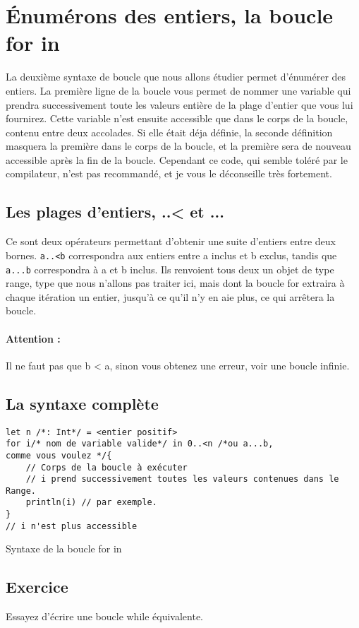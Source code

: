 \section{Énumérons des entiers, la boucle for in}
La deuxième syntaxe de boucle que nous allons étudier permet d'énumérer des entiers.
La première ligne de la boucle vous permet de nommer une variable qui prendra successivement toute les valeurs entière de la plage d'entier que vous lui fournirez.
Cette variable n'est ensuite accessible que dans le corps de la boucle,
contenu entre deux accolades.
Si elle était déja définie,
la seconde définition masquera la première dans le corps de la boucle,
et la première sera de nouveau accessible après la fin de la boucle.
Cependant ce code, qui semble toléré par le compilateur,
n'est pas recommandé, et je vous le déconseille très fortement.
\subsection{Les plages d'entiers, ..< et ...}
Ce sont deux opérateurs permettant d'obtenir une suite d'entiers entre deux bornes. \verb"a..<b" correspondra aux entiers entre a inclus et b exclus, tandis que \verb"a...b" correspondra à a et b inclus. Ils renvoient tous deux un objet de type range, type que nous n'allons pas traiter ici, mais dont la boucle for extraira à chaque itération un entier, jusqu'à ce qu'il n'y en aie plus, ce qui arrêtera la boucle.
\paragraph{Attention :}
Il ne faut pas que b < a, sinon vous obtenez une erreur, voir une boucle infinie. 
\subsection{La syntaxe complète}
\begin{listing}[h]
\begin{verbatim}
let n /*: Int*/ = <entier positif>
for i/* nom de variable valide*/ in 0..<n /*ou a...b,
comme vous voulez */{
    // Corps de la boucle à exécuter
    // i prend successivement toutes les valeurs contenues dans le Range.
    println(i) // par exemple.
}
// i n'est plus accessible
\end{verbatim}
\caption{Syntaxe de la boucle for in}
\end{listing}
\subsection{Exercice}
Essayez d'écrire une boucle while équivalente.

